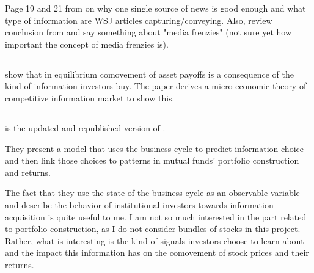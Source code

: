 Page 19 and 21 from \textcite{Veldkamp2006} on why one single source of news is good enough and what type of information are WSJ articles capturing/conveying. 
Also, review conclusion from \textcite{Veldkamp2006} and say something about "media frenzies" (not sure yet how important the concept of media frenzies is).



\clearpage
\subsection{\textcite{Veldkamp2006a}}

\textcite{Veldkamp2006a} show that in equilibrium comovement of asset payoffs is a consequence of the kind of information investors buy. The paper derives a micro-economic theory of competitive information market to show this.









\clearpage
\subsection{\textcite{Kacperczyk2016}}
\cite{Kacperczyk2016} is the updated and republished version of \cite{Kacperczyk2012}.

They present a model that uses the business cycle to predict information choice and then link those choices to patterns in mutual funds' portfolio construction and returns.

The fact that they use the state of the business cycle as an observable variable and describe the behavior of institutional investors towards information acquisition is quite useful to me. I am not so much interested in the part related to portfolio construction, as I do not consider bundles of stocks in this project. Rather, what is interesting is the kind of signals investors choose to learn about and the impact this information has on the comovement of stock prices and their returns.


